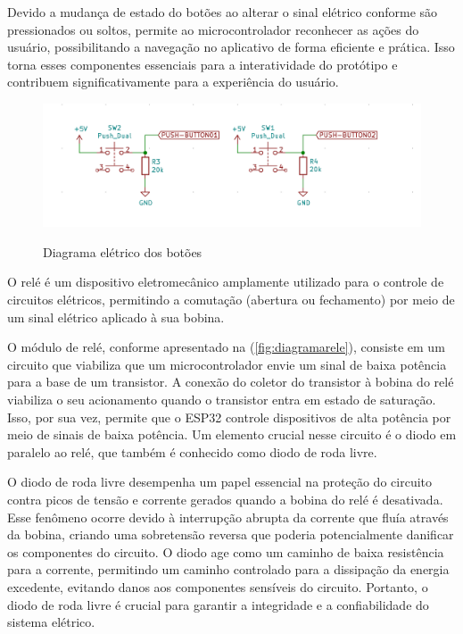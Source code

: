 Devido a mudança de estado do botões ao alterar o sinal elétrico conforme 
são pressionados ou soltos, permite ao microcontrolador reconhecer as ações 
do usuário, possibilitando a navegação no aplicativo de forma eficiente 
e prática. Isso torna esses componentes essenciais para a interatividade 
do protótipo e contribuem significativamente para a experiência do usuário.

\begin{figure}[h!]
    \centering
    \caption{Diagrama elétrico dos botões}
    \includegraphics[scale=0.25]{figuras/modulo_push.png}
    \fonte{}%
    \label{fig:diagramabotoes}
    \centering
\end{figure}

O relé é um dispositivo eletromecânico amplamente utilizado para o controle 
de circuitos elétricos, permitindo a comutação (abertura ou fechamento) 
por meio de um sinal elétrico aplicado à sua bobina.

O módulo de relé, conforme apresentado na (\autoref{fig:diagramarele}), 
consiste em um circuito que viabiliza que um microcontrolador 
envie um sinal de baixa potência para a base de um transistor. A conexão do 
coletor do transistor à bobina do relé viabiliza o seu acionamento 
quando o transistor entra em estado de saturação. Isso, por sua vez, permite que o ESP32 
controle dispositivos de alta potência por meio de sinais de baixa potência. 
Um elemento crucial nesse circuito é o diodo em paralelo ao relé, 
que também é conhecido como diodo de roda livre.

O diodo de roda livre desempenha um papel essencial na proteção do 
circuito contra picos de tensão e corrente gerados quando a bobina 
do relé é desativada. Esse fenômeno ocorre devido à interrupção 
abrupta da corrente que fluía através da bobina, criando uma sobretensão 
reversa que poderia potencialmente danificar os componentes do circuito. 
O diodo age como um caminho de baixa resistência para a corrente, 
permitindo um caminho controlado para a dissipação da energia excedente, 
evitando danos aos componentes sensíveis do circuito. Portanto, o diodo 
de roda livre é crucial para garantir a integridade e a confiabilidade 
do sistema elétrico.

